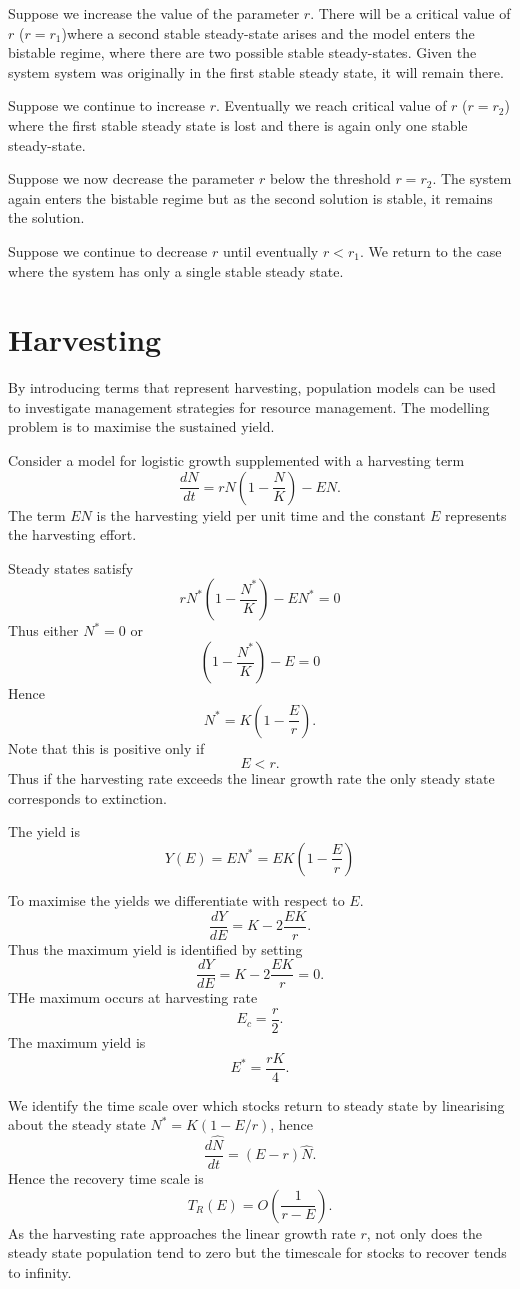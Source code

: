 \documentclass[
  letterpaper,
  DIV=11,
  numbers=noendperiod]{scrreprt}
\begin{document}
Suppose we increase the value of the parameter \(r\). There will be a
critical value of \(r\) (\(r=r_1\))where a second stable steady-state
arises and the model enters the bistable regime, where there are two
possible stable steady-states. Given the system system was originally in
the first stable steady state, it will remain there.

Suppose we continue to increase \(r\). Eventually we reach critical
value of \(r\) (\(r=r_2\)) where the first stable steady state is lost
and there is again only one stable steady-state.

Suppose we now decrease the parameter \(r\) below the threshold
\(r=r_2\). The system again enters the bistable regime but as the second
solution is stable, it remains the solution.

Suppose we continue to decrease \(r\) until eventually \(r<r_1\). We
return to the case where the system has only a single stable steady
state.

\section{Harvesting}\label{harvesting}

By introducing terms that represent harvesting, population models can be
used to investigate management strategies for resource management. The
modelling problem is to maximise the sustained yield.

Consider a model for logistic growth supplemented with a harvesting term
\[
\frac{dN}{dt}=rN\left(1-\frac{N}{K}\right) -EN.
\] The term \(EN\) is the harvesting yield per unit time and the
constant \(E\) represents the harvesting effort.

Steady states satisfy \[
rN^*\left(1-\frac{N^*}{K}\right) -EN^*=0
\] Thus either \(N^*=0\) or \[
\left(1-\frac{N^*}{K}\right) -E=0
\] Hence \[
N^*=K(1-\frac{E}{r}).
\] Note that this is positive only if \[
E<r.
\] Thus if the harvesting rate exceeds the linear growth rate the only
steady state corresponds to extinction.

The yield is \[
Y(E)=EN^*=EK(1-\frac{E}{r})
\]

To maximise the yields we differentiate with respect to \(E\). \[
\frac{dY}{dE} = K - 2\frac{EK}{r}.
\] Thus the maximum yield is identified by setting \[
\frac{dY}{dE} = K - 2\frac{EK}{r}=0.
\] THe maximum occurs at harvesting rate \[
E_c=\frac{r}{2}.
\] The maximum yield is \[
E^*=\frac{rK}{4}.
\]

We identify the time scale over which stocks return to steady state by
linearising about the steady state \(N^*=K(1-E/r)\), hence \[
\frac{d \hat{N}}{dt} = (E-r)\hat{N}.
\] Hence the recovery time scale is \[
T_R(E)=O(\frac{1}{r-E}).
\] As the harvesting rate approaches the linear growth rate \(r\), not
only does the steady state population tend to zero but the timescale for
stocks to recover tends to infinity.
\end{document}
